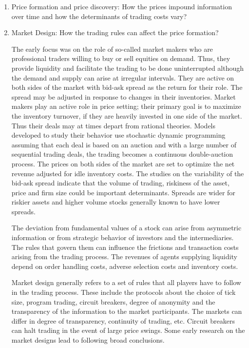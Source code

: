 \begin{enumerate}[--]
\item Price formation and price discovery: How the prices impound information over time and how the determinants of trading costs vary?

\item Market Design: How the trading rules can affect the price formation? 

The early focus was on the role of so-called market makers who are professional traders willing to buy or sell equities on demand. Thus, they provide liquidity and facilitate the trading to be done uninterrupted although the demand and supply can arise at irregular intervals. They are active on both sides of the market with bid-ask spread as the return for their role. The spread may be adjusted in response to changes in their inventories. Market makers play an active role in price setting; their primary goal is to maximize the inventory turnover, if they are heavily invested in one side of the market. Thus their deals may at times depart from rational theories. Models developed to study their behavior use stochastic dynamic programming assuming that each deal is based on an auction and with a large number of sequential trading deals, the trading becomes a continuous double-auction process. The prices on both sides of the market are set to optimize the net revenue adjusted for idle inventory costs. The studies on the variability of the bid-ask spread indicate that the volume of trading, riskiness of the asset, price and firm size could be important determinants. Spreads are wider for riskier assets and higher volume stocks generally known to have lower spreads.


The deviation from fundamental values of a stock can arise from asymmetric information or from strategic behavior of investors and the intermediaries. The rules that govern them can influence the frictions and transaction costs arising from the trading process. The revenues of agents supplying liquidity depend on order handling costs, adverse selection costs and inventory costs. 


Market design generally refers to a set of rules that all players have to follow in the trading process. These include the protocols about the choice of tick size, program trading, circuit breakers, degree of anonymity and the transparency of the information to the market participants. The markets can differ in degree of transparency, continuity of trading, etc. Circuit breakers can halt trading in the event of large price swings. Some early research on the market  designs lead to following broad conclusions.


\end{enumerate}
